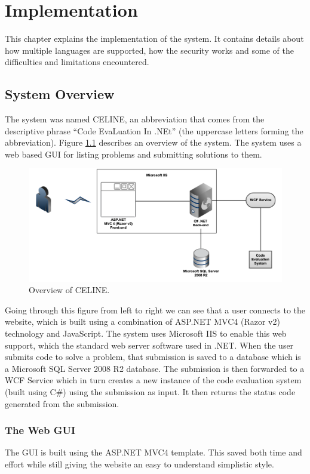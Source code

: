 \chapter{Implementation}
This chapter explains the implementation of the system. It contains details about how multiple languages are supported, how the security works and some of the difficulties and limitations encountered.

\section{System Overview}
The system was named CELINE, an abbreviation that comes from the descriptive phrase ``Code EvaLuation In .NEt'' (the uppercase letters forming the abbreviation). Figure \ref{fig:SystemOverview} describes an overview of the system. The system uses a web based GUI for listing problems and submitting solutions to them.

\begin{figure}[h]
	\centering
	\includegraphics[width=\linewidth]{sections/media/overview.png}
	\caption{Overview of CELINE.}
	\label{fig:SystemOverview}
\end{figure}

Going through this figure from left to right we can see that a user connects to the website, which is built using a combination of ASP.NET MVC4 (Razor v2) technology and JavaScript. The system uses Microsoft IIS to enable this web support, which the standard web server software used in .NET. When the user submits code to solve a problem, that submission is saved to a database which is a Microsoft SQL Server 2008 R2 database. The submission is then forwarded to a WCF Service which in turn creates a new instance of the code evaluation system (built using C\#) using the submission as input. It then returns the status code generated from the submission. 

\subsection{The Web GUI}
The GUI is built using the ASP.NET MVC4 template. This saved both time and effort while still giving the website an easy to understand simplistic style. 

